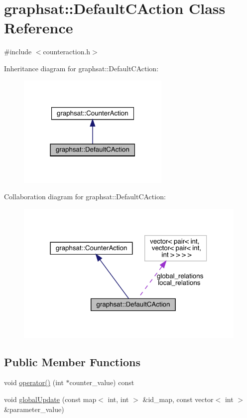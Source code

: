\hypertarget{classgraphsat_1_1_default_c_action}{}\section{graphsat\+::Default\+C\+Action Class Reference}
\label{classgraphsat_1_1_default_c_action}


{\ttfamily \#include $<$counteraction.\+h$>$}



Inheritance diagram for graphsat\+::Default\+C\+Action\+:\nopagebreak
\begin{figure}[H]
\begin{center}
\leavevmode
\includegraphics[width=207pt]{classgraphsat_1_1_default_c_action__inherit__graph}
\end{center}
\end{figure}


Collaboration diagram for graphsat\+::Default\+C\+Action\+:
\nopagebreak
\begin{figure}[H]
\begin{center}
\leavevmode
\includegraphics[width=316pt]{classgraphsat_1_1_default_c_action__coll__graph}
\end{center}
\end{figure}
\subsection*{Public Member Functions}
\begin{DoxyCompactItemize}
\item 
void \mbox{\hyperlink{classgraphsat_1_1_default_c_action_a78b8f5f344c61e83c83fca04be2a4d73}{operator()}} (int $\ast$counter\+\_\+value) const
\item 
void \mbox{\hyperlink{classgraphsat_1_1_default_c_action_a70f9da2bbdd46e42d279b867195daa56}{global\+Update}} (const map$<$ int, int $>$ \&id\+\_\+map, const vector$<$ int $>$ \&parameter\+\_\+value)
\end{DoxyCompactItemize}
